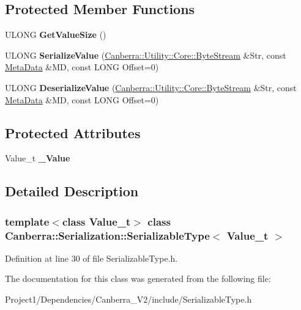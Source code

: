 \subsection*{Protected Member Functions}
\begin{DoxyCompactItemize}
\item 
\mbox{\label{class_canberra_1_1_serialization_1_1_serializable_type_a3e8e5c7ff15b3064380b496bbd833c14}} 
U\+L\+O\+NG {\bfseries Get\+Value\+Size} ()
\item 
\mbox{\label{class_canberra_1_1_serialization_1_1_serializable_type_aa1dfed2c0cbb7f3b4f6290e361d33ec3}} 
U\+L\+O\+NG {\bfseries Serialize\+Value} (\hyperlink{class_canberra_1_1_utility_1_1_core_1_1_byte_stream}{Canberra\+::\+Utility\+::\+Core\+::\+Byte\+Stream} \&Str, const \hyperlink{class_canberra_1_1_serialization_1_1_meta_data}{Meta\+Data} \&MD, const L\+O\+NG Offset=0)
\item 
\mbox{\label{class_canberra_1_1_serialization_1_1_serializable_type_a576e6f6b68fbf1346da0b0db7afefb05}} 
U\+L\+O\+NG {\bfseries Deserialize\+Value} (\hyperlink{class_canberra_1_1_utility_1_1_core_1_1_byte_stream}{Canberra\+::\+Utility\+::\+Core\+::\+Byte\+Stream} \&Str, const \hyperlink{class_canberra_1_1_serialization_1_1_meta_data}{Meta\+Data} \&MD, const L\+O\+NG Offset=0)
\end{DoxyCompactItemize}
\subsection*{Protected Attributes}
\begin{DoxyCompactItemize}
\item 
\mbox{\label{class_canberra_1_1_serialization_1_1_serializable_type_a288ec1f0073953e3e78bdc5875bd9248}} 
Value\+\_\+t {\bfseries \+\_\+\+Value}
\end{DoxyCompactItemize}


\subsection{Detailed Description}
\subsubsection*{template$<$class Value\+\_\+t$>$\newline
class Canberra\+::\+Serialization\+::\+Serializable\+Type$<$ Value\+\_\+t $>$}



Definition at line 30 of file Serializable\+Type.\+h.



The documentation for this class was generated from the following file\+:\begin{DoxyCompactItemize}
\item 
Project1/\+Dependencies/\+Canberra\+\_\+\+V2/include/Serializable\+Type.\+h\end{DoxyCompactItemize}
